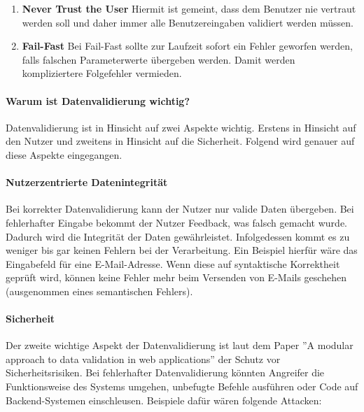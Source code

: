 \begin{enumerate}

    \item \textbf{Never Trust the User} Hiermit ist gemeint, dass dem Benutzer nie vertraut werden soll und daher immer alle Benutzereingaben validiert werden müssen.
    
    \item \textbf{Fail-Fast} Bei Fail-Fast sollte zur Laufzeit sofort ein Fehler geworfen werden, falls falschen Parameterwerte übergeben werden. Damit werden kompliziertere Folgefehler vermieden.
    
\end{enumerate}

\paragraph{Warum ist Datenvalidierung wichtig?}
Datenvalidierung ist in Hinsicht auf zwei Aspekte wichtig. Erstens in Hinsicht auf den Nutzer und zweitens in Hinsicht auf die Sicherheit. Folgend wird genauer auf diese Aspekte eingegangen. \cite{prompt6_pollak}

\paragraph{Nutzerzentrierte Datenintegrität}
Bei korrekter Datenvalidierung kann der Nutzer nur valide Daten übergeben. Bei fehlerhafter Eingabe bekommt der Nutzer Feedback, was falsch gemacht wurde. Dadurch wird die Integrität der Daten gewährleistet. Infolgedessen kommt es zu weniger bis gar keinen Fehlern bei der Verarbeitung. Ein Beispiel hierfür wäre das Eingabefeld für eine E-Mail-Adresse. Wenn diese auf syntaktische Korrektheit geprüft wird, können keine Fehler mehr beim Versenden von E-Mails geschehen (ausgenommen eines semantischen Fehlers).

\paragraph{Sicherheit}
\label{sec:sicherheit}
Der zweite wichtige Aspekt der Datenvalidierung ist laut dem Paper ''A modular approach to data validation in web applications'' \cite{DeVries2006} der Schutz vor Sicherheitsrisiken. Bei fehlerhafter Datenvalidierung könnten Angreifer die Funktionsweise des Systems umgehen, unbefugte Befehle ausführen oder Code auf Backend-Systemen einschleusen. Beispiele dafür wären folgende Attacken:

